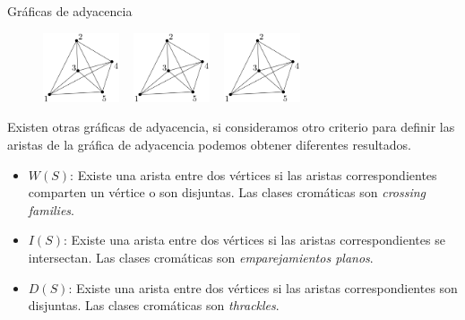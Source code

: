 \begin{frame}{Gráficas de adyacencia}
\begin{figure}
	\centering
	\includegraphics[width=0.2\textwidth]{images/K5}%
	~\vrule
	\includegraphics[width=0.2\textwidth]{images/K5}%
	~\vrule
	\includegraphics[width=0.2\textwidth]{images/K5}%
\end{figure}
Existen otras gráficas de adyacencia, si consideramos otro criterio para definir las aristas de la gráfica de adyacencia podemos obtener diferentes resultados.
\begin{itemize}
	\item $W(S)$: Existe una arista entre dos vértices si las aristas correspondientes comparten un vértice o son disjuntas. Las clases cromáticas son \emph{crossing families}.
	\item $I(S)$: Existe una arista entre dos vértices si las aristas correspondientes se intersectan. Las clases cromáticas son \emph{emparejamientos planos}.
	\item $D(S)$: Existe una arista entre dos vértices si las aristas correspondientes son disjuntas. Las clases cromáticas son \emph{thrackles}.
\end{itemize}


\end{frame}
